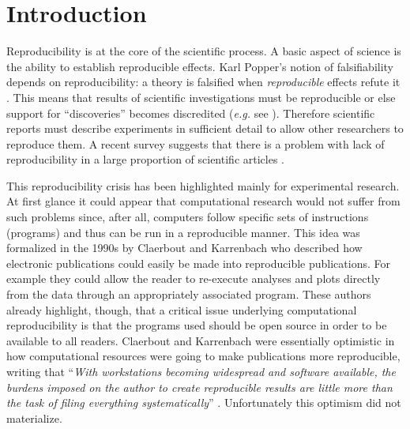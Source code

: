 \date{Received: date / Accepted: date}


\maketitle

\begin{abstract}
Like other types of computational research, modeling and simulation of biological processes (biomodels) is still largely communicated without sufficient detail to allow independent reproduction of results. But reproducibility in this area of research could easily be achieved by making use of existing resources, such as supplying models in standard formats and depositing code, models, and results in public repositories. 
\end{abstract}

\section{Introduction}
\label{intro}
Reproducibility is at the core of the scientific process. A basic aspect of science is the ability to establish reproducible effects. Karl Popper's notion of falsifiability depends on reproducibility: a theory is falsified when {\it reproducible} effects refute it \cite{popper1959}. This means that results of scientific investigations must be reproducible or else support for ``discoveries'' becomes discredited ({\it e.g.} see \cite{maddox88}). 
Therefore scientific reports must describe experiments in sufficient detail to allow other researchers to reproduce them. A recent survey suggests that there is a problem with lack of reproducibility in a large proportion of scientific articles \cite{baker2016}.

This reproducibility crisis has been highlighted mainly for experimental research. At first glance it could appear that computational research would not suffer from such problems since, after all, computers follow specific sets of instructions (programs) and thus can be run in a reproducible manner. This idea was formalized in the 1990s by Claerbout and Karrenbach \cite{claerbout1992} who described how electronic publications could easily be made into reproducible publications. For example they could allow the reader to re-execute analyses and plots directly from the data through an appropriately associated program. These authors already highlight, though, that a critical issue underlying computational reproducibility is that the programs used should be open source in order to be available to all readers. Claerbout and Karrenbach were essentially optimistic in how computational resources were going to make publications more reproducible, writing that ``{\it With workstations becoming widespread and software available, the burdens imposed on the author to create reproducible results are little more than the task of filing everything systematically}'' \cite{claerbout1992}. Unfortunately this optimism did not materialize.

